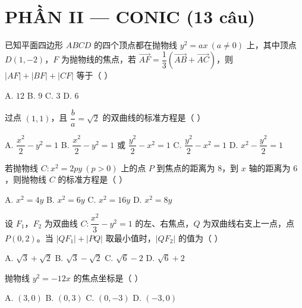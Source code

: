 \documentclass[11pt, a4paper]{article}
\begin{document}
\section{PHẦN II — CONIC (13 câu)}

\begin{baitap}[13]
已知平面四边形 $ABCD$ 的四个顶点都在抛物线 $y^2=ax\ (a\neq0)$ 上，其中顶点 $D(1,-2)$，$F$ 为抛物线的焦点，若 $\overrightarrow{AF}=\dfrac{1}{3}(\overrightarrow{AB}+\overrightarrow{AC})$，则 $\lvert AF\rvert+\lvert BF\rvert+\lvert CF\rvert$ 等于（ ）
\par\vspace{3pt}
\noindent A. $12$ \quad B. $9$ \quad C. $3$ \quad D. $6$
\end{baitap}

\begin{baitap}[14]
过点 $(1,1)$，且 $\dfrac{b}{a}=\sqrt{2}$ 的双曲线的标准方程是（ ）
\par\vspace{3pt}
\noindent A. $\dfrac{x^2}{2}-y^2=1$ \quad B. $\dfrac{x^2}{2}-y^2=1$ 或 $\dfrac{y^2}{2}-x^2=1$ \quad C. $\dfrac{y^2}{2}-x^2=1$ \quad D. $x^2-\dfrac{y^2}{2}=1$
\end{baitap}

\begin{baitap}[15]
若抛物线 $C:x^2=2py\ (p>0)$ 上的点 $P$ 到焦点的距离为 $8$，到 $x$ 轴的距离为 $6$，则抛物线 $C$ 的标准方程是（ ）
\par\vspace{3pt}
\noindent A. $x^2=4y$ \quad B. $x^2=6y$ \quad C. $x^2=16y$ \quad D. $x^2=8y$
\end{baitap}

\begin{baitap}[16]
设 $F_1$，$F_2$ 为双曲线 $C:\dfrac{x^2}{3}-y^2=1$ 的左、右焦点，$Q$ 为双曲线右支上一点，点 $P(0,2)$。当 $\lvert QF_1\rvert+\lvert PQ\rvert$ 取最小值时，$\lvert QF_2\rvert$ 的值为（ ）
\par\vspace{3pt}
\noindent A. $\sqrt{3}+\sqrt{2}$ \quad B. $\sqrt{3}-\sqrt{2}$ \quad C. $\sqrt{6}-2$ \quad D. $\sqrt{6}+2$
\end{baitap}

\begin{baitap}[17]
抛物线 $y^2=-12x$ 的焦点坐标是（ ）
\par\vspace{3pt}
\noindent A. $(3,0)$ \quad B. $(0,3)$ \quad C. $(0,-3)$ \quad D. $(-3,0)$
\end{baitap}
\end{document}
